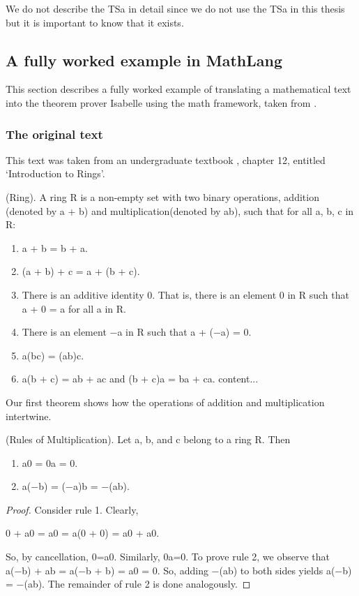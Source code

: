 We do not describe the TSa in detail since we do not use the TSa in this thesis
but it is important to know that it exists.

\subsection{A fully worked example in MathLang}

This section describes a fully worked example of translating a mathematical text
into the theorem prover Isabelle using the \gls{math} framework, taken from
\cite{lamarphd}.

\subsubsection{The original text}

This text was taken from an undergraduate textbook
\cite{joseph2002contemporary}, chapter 12, entitled `Introduction to Rings'.

\begin{tcolorbox}

\begin{defin}
(Ring). A ring R is a non-empty set with two binary operations, addition
(denoted by a + b) and multiplication(denoted by ab), such that for all a, b, c
in R:
\begin{enumerate}
\item a + b = b + a.
\item (a + b) + c = a + (b + c).
\item There is an additive identity 0. That is, there is an element 0 in R such
that a + 0 = a for all a in R.
\item There is an element −a in R such that a + (−a) = 0.
\item a(bc) = (ab)c.
\item a(b + c) = ab + ac and (b + c)a = ba + ca. content...
\end{enumerate}
Our first theorem shows how the operations of addition and multiplication
intertwine.
\end{defin}

\begin{thm}
(Rules of Multiplication). Let a, b, and c belong to a ring R. Then
\begin{enumerate}
\item a0 = 0a = 0.
\item a(−b) = (−a)b = −(ab).
\end{enumerate}
\end{thm}

\begin{proof}
Consider rule 1. Clearly,

\begin{center}
0 + a0 = a0 = a(0 + 0) = a0 + a0.
\end{center}
So, by cancellation, 0=a0. Similarly, 0a=0. To prove rule 2, we observe that
a(−b) + ab = a(−b + b) = a0 = 0. So, adding −(ab) to both sides yields a(−b) =
−(ab). The remainder of rule 2 is done analogously.
\end{proof}
\end{tcolorbox}

